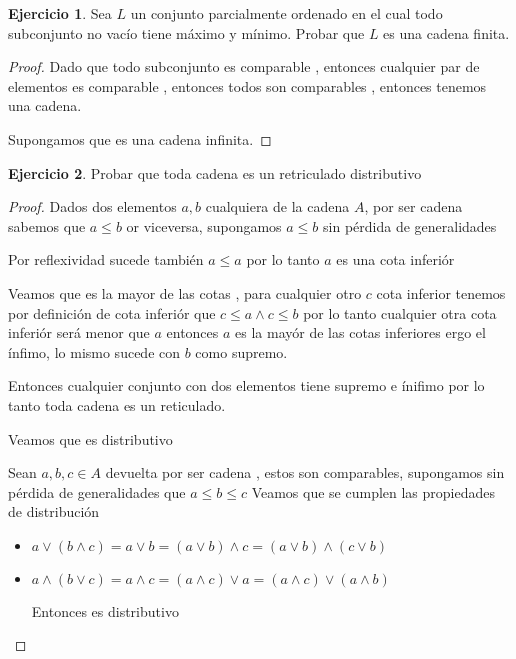 \documentclass[12pt]{article}
\theoremstyle{definition}
\newtheorem{ej}{Ejercicio}
\begin{document}
\begin{ej}
	Sea $L$ un conjunto parcialmente ordenado en el cual todo subconjunto no vacío tiene máximo y mínimo. Probar que $L$ es una cadena finita.

	\begin{proof}
		Dado que todo subconjunto es comparable , entonces cualquier par de elementos es comparable , entonces todos son comparables , entonces tenemos una cadena.

		Supongamos que es una cadena infinita.
	\end{proof}
\end{ej}
\begin{ej}
	
	Probar que toda cadena es un retriculado distributivo
	\begin{proof}
		Dados dos elementos $a,b$ cualquiera de la cadena $A$, por ser cadena sabemos que $a\leq b$ or viceversa, supongamos $a\leq b$ sin pérdida de generalidades

		Por reflexividad sucede también $a \leq a$ por lo tanto $a$ es una cota inferiór 

		Veamos que es la mayor de las cotas , para cualquier otro $c$ cota inferior tenemos por definición de cota inferiór que $c \leq a \land c \leq b$ por lo tanto cualquier otra cota inferiór será menor que $a$ entonces $a$ es la mayór de las cotas inferiores ergo el ínfimo, lo mismo sucede con $b$ como supremo.

		Entonces cualquier conjunto con dos elementos tiene supremo e ínifimo por lo tanto toda cadena es un reticulado.

		Veamos que es distributivo 

		Sean $a,b,c \in A$ devuelta por ser cadena , estos son comparables, supongamos sin pérdida de generalidades que $a\leq b \leq c$
\newpage
		Veamos que se cumplen las propiedades de distribución
		\begin{itemize}

		\item $a \lor (b \land c) = a \lor b = (a \lor b) \land c = (a \lor b) \land (c \lor b) $

		\item $a \land (b \lor c) = a \land c = (a \land c) \lor a = (a\land c) \lor (a \land b)$ 

			Entonces es distributivo
	\end{itemize}

\end{proof}
\end{ej}
\end{document}
